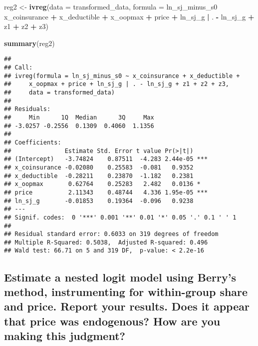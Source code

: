 \documentclass[]{article}
\newenvironment{Shaded}{\begin{snugshade}}{\end{snugshade}}
\newcommand{\DataTypeTok}[1]{\textcolor[rgb]{0.13,0.29,0.53}{#1}}
\newcommand{\KeywordTok}[1]{\textcolor[rgb]{0.13,0.29,0.53}{\textbf{#1}}}
\newcommand{\NormalTok}[1]{#1}
\newcommand{\OperatorTok}[1]{\textcolor[rgb]{0.81,0.36,0.00}{\textbf{#1}}}
\newcommand{\StringTok}[1]{\textcolor[rgb]{0.31,0.60,0.02}{#1}}
\begin{document}
\begin{Shaded}
\begin{Highlighting}[]
\NormalTok{reg2 <-}\StringTok{ }\KeywordTok{ivreg}\NormalTok{(}\DataTypeTok{data =}\NormalTok{ transformed_data, }
      \DataTypeTok{formula =}\NormalTok{ ln_sj_minus_s0 }\OperatorTok{~}\StringTok{ }\NormalTok{x_coinsurance }\OperatorTok{+}\StringTok{ }\NormalTok{x_deductible }\OperatorTok{+}\StringTok{ }\NormalTok{x_oopmax }\OperatorTok{+}\StringTok{ }\NormalTok{price }\OperatorTok{+}\StringTok{ }\NormalTok{ln_sj_g }\OperatorTok{|}\StringTok{ }\NormalTok{. }\OperatorTok{-}\StringTok{ }\NormalTok{ln_sj_g }\OperatorTok{+}\StringTok{ }\NormalTok{z1 }\OperatorTok{+}\StringTok{ }\NormalTok{z2 }\OperatorTok{+}\StringTok{ }\NormalTok{z3)}

\KeywordTok{summary}\NormalTok{(reg2)}
\end{Highlighting}
\end{Shaded}

\begin{verbatim}
## 
## Call:
## ivreg(formula = ln_sj_minus_s0 ~ x_coinsurance + x_deductible + 
##     x_oopmax + price + ln_sj_g | . - ln_sj_g + z1 + z2 + z3, 
##     data = transformed_data)
## 
## Residuals:
##     Min      1Q  Median      3Q     Max 
## -3.0257 -0.2556  0.1309  0.4060  1.1356 
## 
## Coefficients:
##               Estimate Std. Error t value Pr(>|t|)    
## (Intercept)   -3.74824    0.87511  -4.283 2.44e-05 ***
## x_coinsurance -0.02080    0.25583  -0.081   0.9352    
## x_deductible  -0.28211    0.23870  -1.182   0.2381    
## x_oopmax       0.62764    0.25283   2.482   0.0136 *  
## price          2.11343    0.48744   4.336 1.95e-05 ***
## ln_sj_g       -0.01853    0.19364  -0.096   0.9238    
## ---
## Signif. codes:  0 '***' 0.001 '**' 0.01 '*' 0.05 '.' 0.1 ' ' 1
## 
## Residual standard error: 0.6033 on 319 degrees of freedom
## Multiple R-Squared: 0.5038,  Adjusted R-squared: 0.496 
## Wald test: 66.71 on 5 and 319 DF,  p-value: < 2.2e-16
\end{verbatim}

\hypertarget{estimate-a-nested-logit-model-using-berrys-method-instrumenting-for-within-group-share-and-price.-report-your-results.-does-it-appear-that-price-was-endogenous-how-are-you-making-this-judgment}{%
\subsection{Estimate a nested logit model using Berry's method,
instrumenting for within-group share and price. Report your results.
Does it appear that price was endogenous? How are you making this
judgment?}\label{estimate-a-nested-logit-model-using-berrys-method-instrumenting-for-within-group-share-and-price.-report-your-results.-does-it-appear-that-price-was-endogenous-how-are-you-making-this-judgment}}
\end{document}
